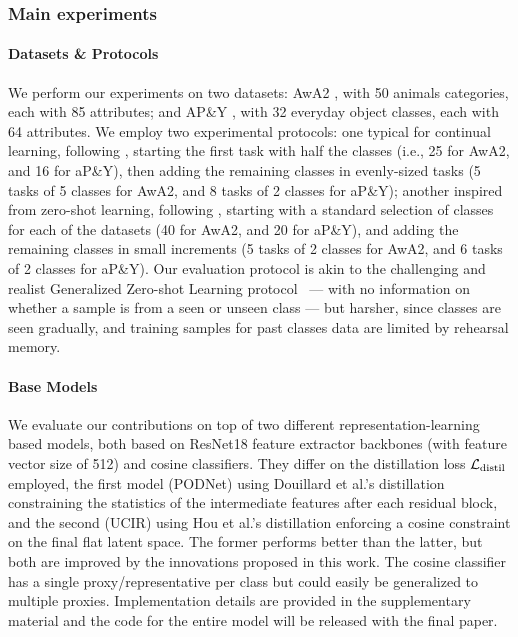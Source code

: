 \subsubsection{Main experiments}
\label{sec:ghost_quantitative}

\paragraph{Datasets \& Protocols} We perform our experiments on two datasets: AwA2
\cite{xian2019awa2}, with 50 animals categories, each with 85 attributes; and AP\&Y
\cite{farhadi2009apy}, with 32 everyday object classes, each with 64 attributes. We employ two
experimental protocols: one typical for continual learning, following
\cite{hou2019ucir,douillard2020podnet}, starting the first task with half the classes (i.e., 25 for
AwA2, and 16 for aP\&Y), then adding the remaining classes in evenly-sized tasks (5 tasks of 5
classes for AwA2, and 8 tasks of 2 classes for aP\&Y); another inspired from zero-shot learning,
following \cite{xian2019awa2}, starting with a standard selection of classes for each of the
datasets (40 for AwA2, and 20 for aP\&Y), and adding the remaining classes in small increments (5
tasks of 2 classes for AwA2, and 6 tasks of 2 classes for aP\&Y). Our evaluation protocol is akin to
the challenging and realist Generalized Zero-shot Learning \citep{scheirer2013generalizedzeroshot,
    chao2016generalizedzeroshot} protocol  — with no information on whether a sample is from a seen or
unseen class — but harsher, since classes are seen gradually, and training samples for past classes
data are limited by rehearsal memory.

\paragraph{Base Models} We evaluate our contributions on top of two different
representation-learning based models, both based on ResNet18 \citep{he2016resnet} feature extractor
backbones (with feature vector size of 512) and cosine classifiers. They differ on the distillation
loss $\mathcal{L}_\text{distil}$ employed, the first model (PODNet) using Douillard et al.'s distillation
\cite{douillard2020podnet} constraining the statistics of the intermediate features after each
residual block, and the second (UCIR) using Hou et al.'s distillation \citep{hou2019ucir} enforcing
a cosine constraint on the final flat latent space. The former performs better than the latter, but
both are improved by the innovations proposed in this work. The cosine classifier has a single
proxy/representative per class but could easily be generalized to multiple proxies. Implementation
details are provided in the supplementary material and the code for the entire model will be
released with the final paper.

